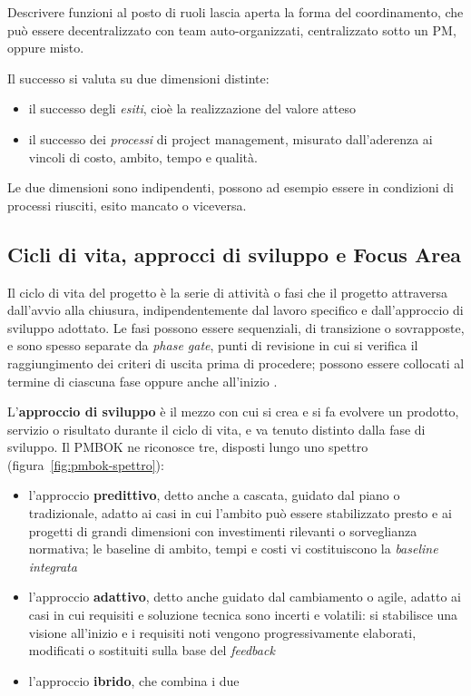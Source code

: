 Descrivere funzioni al posto di ruoli lascia aperta la forma del coordinamento,
che pu\`o essere decentralizzato con team auto-organizzati, centralizzato sotto
un PM, oppure misto.

Il successo si valuta su due dimensioni distinte:
\begin {itemize}
\item il successo degli \emph{esiti}, cio\`e la realizzazione del valore atteso
\item il successo dei \emph{processi} di project management, misurato dall'aderenza ai vincoli di
costo, ambito, tempo e qualit\`a.
\end {itemize}
Le due dimensioni sono indipendenti, possono ad esempio essere in condizioni di
processi riusciti, esito mancato o viceversa.


\subsection{Cicli di vita, approcci di sviluppo e Focus Area}

Il ciclo di vita del progetto \`e la serie di attivit\`a o fasi che il progetto
attraversa dall'avvio alla chiusura, indipendentemente dal lavoro specifico e
dall'approccio di sviluppo adottato. Le fasi possono essere sequenziali, di
transizione o sovrapposte, e sono spesso separate da \emph{phase gate}, punti di
revisione in cui si verifica il raggiungimento dei criteri di uscita prima di
procedere; possono essere collocati al termine di ciascuna fase oppure anche
all'inizio \cite{pmbok8}.

L'\textbf{approccio di sviluppo} \`e il mezzo con cui si crea e si fa evolvere
un prodotto, servizio o risultato durante il ciclo di vita, e va tenuto distinto
dalla fase di sviluppo. Il PMBOK ne riconosce tre, disposti lungo uno spettro
(figura~\ref{fig:pmbok-spettro}):
\begin {itemize}
\item l'approccio \textbf{predittivo}, detto anche a cascata, guidato dal piano
o tradizionale, adatto ai casi in cui l'ambito pu\`o essere stabilizzato presto
e ai progetti di grandi dimensioni con investimenti rilevanti o sorveglianza
normativa; le baseline di ambito, tempi e costi vi costituiscono la
\emph{baseline integrata}
\item l'approccio \textbf{adattivo}, detto anche guidato dal cambiamento o
agile, adatto ai casi in cui requisiti e soluzione tecnica sono incerti e
volatili: si stabilisce una visione all'inizio e i requisiti noti vengono
progressivamente elaborati, modificati o sostituiti sulla base del
\emph{feedback}
\item l'approccio \textbf{ibrido}, che combina i due
\end {itemize}

